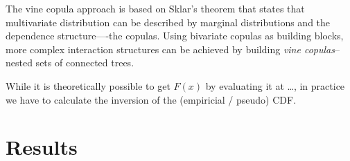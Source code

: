 \documentclass{article}
\begin{document}
The vine copula approach is based on Sklar's theorem that states that
multivariate distribution can be described by marginal distributions
and the dependence structure----the copulas. Using bivariate copulas
as building blocks, more complex interaction structures can be
achieved by building \emph{vine copulas}--nested sets of connected
trees.

While it is theoretically possible to get $F(x)$ by evaluating it at
\ldots, in practice we have to calculate the inversion of the
(empiricial / pseudo) CDF.
                                          
\section{Results}
\label{sec:results}
\end{document}
